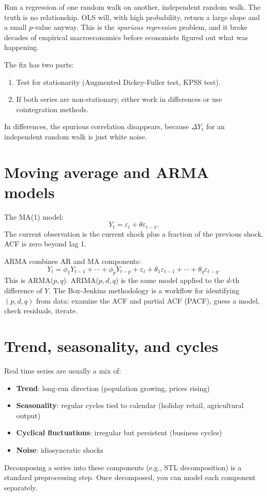 Run a regression of one random walk on another, independent random walk. The truth is no relationship. OLS will, with high probability, return a large slope and a small $p$-value anyway. This is the \emph{spurious regression} problem, and it broke decades of empirical macroeconomics before economists figured out what was happening.

The fix has two parts:
\begin{enumerate}[noitemsep]
\item Test for stationarity (Augmented Dickey-Fuller test, KPSS test).
\item If both series are non-stationary, either work in differences or use cointegration methods.
\end{enumerate}

In differences, the spurious correlation disappears, because $\Delta Y_t$ for an independent random walk is just white noise.

\section{Moving average and ARMA models}

The MA(1) model:
\[
  Y_t = \varepsilon_t + \theta \varepsilon_{t-1}.
\]
The current observation is the current shock plus a fraction of the previous shock. ACF is zero beyond lag 1.

ARMA combines AR and MA components:
\[
  Y_t = \phi_1 Y_{t-1} + \cdots + \phi_p Y_{t-p} + \varepsilon_t + \theta_1 \varepsilon_{t-1} + \cdots + \theta_q \varepsilon_{t-q}.
\]
This is ARMA($p, q$). ARIMA($p, d, q$) is the same model applied to the $d$-th difference of $Y$. The Box-Jenkins methodology is a workflow for identifying $(p, d, q)$ from data: examine the ACF and partial ACF (PACF), guess a model, check residuals, iterate.

\section{Trend, seasonality, and cycles}

Real time series are usually a mix of:
\begin{itemize}[noitemsep]
\item \textbf{Trend}: long-run direction (population growing, prices rising)
\item \textbf{Seasonality}: regular cycles tied to calendar (holiday retail, agricultural output)
\item \textbf{Cyclical fluctuations}: irregular but persistent (business cycles)
\item \textbf{Noise}: idiosyncratic shocks
\end{itemize}
Decomposing a series into these components (e.g., STL decomposition) is a standard preprocessing step. Once decomposed, you can model each component separately.

